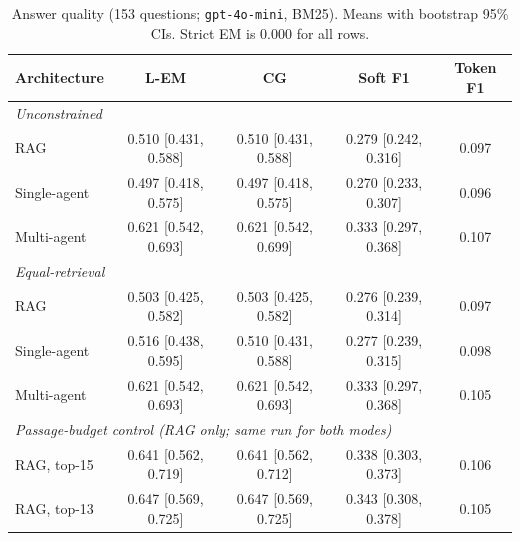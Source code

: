 \documentclass[11pt,a4paper]{article}
\newcommand{\lem}{L-EM}
\newcommand{\cg}{CG}
\begin{document}
\begin{table}[t]
\centering
\small
\caption{Answer quality (153 questions; \texttt{gpt-4o-mini}, BM25). Means
with bootstrap 95\% CIs. Strict EM is 0.000 for all rows.}
\label{tab:quality}
\begin{tabular}{lcccc}
\toprule
Architecture & \lem{} & \cg{} & Soft F1 & Token F1 \\
\midrule
\multicolumn{5}{l}{\emph{Unconstrained}} \\
\quad RAG & 0.510 {\scriptsize[0.431, 0.588]} & 0.510 {\scriptsize[0.431, 0.588]} & 0.279 {\scriptsize[0.242, 0.316]} & 0.097 \\
\quad Single-agent & 0.497 {\scriptsize[0.418, 0.575]} & 0.497 {\scriptsize[0.418, 0.575]} & 0.270 {\scriptsize[0.233, 0.307]} & 0.096 \\
\quad Multi-agent & 0.621 {\scriptsize[0.542, 0.693]} & 0.621 {\scriptsize[0.542, 0.699]} & 0.333 {\scriptsize[0.297, 0.368]} & 0.107 \\
\midrule
\multicolumn{5}{l}{\emph{Equal-retrieval}} \\
\quad RAG & 0.503 {\scriptsize[0.425, 0.582]} & 0.503 {\scriptsize[0.425, 0.582]} & 0.276 {\scriptsize[0.239, 0.314]} & 0.097 \\
\quad Single-agent & 0.516 {\scriptsize[0.438, 0.595]} & 0.510 {\scriptsize[0.431, 0.588]} & 0.277 {\scriptsize[0.239, 0.315]} & 0.098 \\
\quad Multi-agent & 0.621 {\scriptsize[0.542, 0.693]} & 0.621 {\scriptsize[0.542, 0.693]} & 0.333 {\scriptsize[0.297, 0.368]} & 0.105 \\
\midrule
\multicolumn{5}{l}{\emph{Passage-budget control (RAG only; same run for both modes)}} \\
\quad RAG, top-15 & 0.641 {\scriptsize[0.562, 0.719]} & 0.641 {\scriptsize[0.562, 0.712]} & 0.338 {\scriptsize[0.303, 0.373]} & 0.106 \\
\quad RAG, top-13 & 0.647 {\scriptsize[0.569, 0.725]} & 0.647 {\scriptsize[0.569, 0.725]} & 0.343 {\scriptsize[0.308, 0.378]} & 0.105 \\
\bottomrule
\end{tabular}
\end{table}
\end{document}
